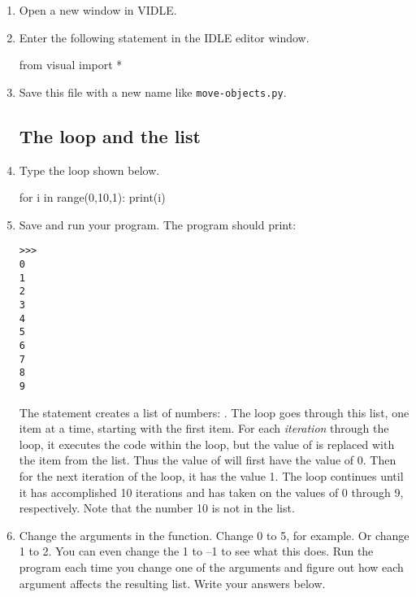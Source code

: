\begin{enumerate}

	\item Open a new window in VIDLE. 
	
	\item Enter the following statement in the IDLE editor window.
	
\begin{myvpython}	
from visual import *
\end{myvpython}

\item Save this file with a new name like \texttt{move-objects.py}.

\subsection*{The  loop and the  list}

\item Type the  loop shown below.

\begin{myvpython}
for i in range(0,10,1):
    print(i)
\end{myvpython}
    
\item Save and run your program. The program should print:

\begin{verbatim}
>>> 
0
1
2
3
4
5
6
7
8
9
\end{verbatim}

The statement  creates a list of numbers: . The  loop goes through this list, one item at a time, starting with the first item. For each \emph{iteration} through the loop, it executes the code within the loop, but the value of  is replaced with the item from the list. Thus the value of  will first have the value of 0. Then for the next iteration of the loop, it has the value 1. The loop continues until it has accomplished 10 iterations and  has taken on the values of 0 through 9, respectively. Note that the number 10 is not in the list.

\item Change the arguments in the  function. Change 0 to 5, for example. Or change 1 to 2. You can even change the 1 to --1 to see what this does. Run the program each time you change one of the arguments and figure out how each argument affects the resulting list. Write your answers below.


\end{enumerate}
